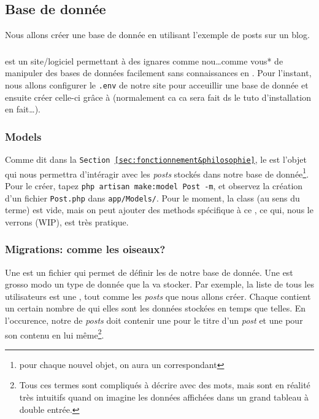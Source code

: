 \subsection{Base de donnée}
Nous allons créer une base de donnée en utilisant l'exemple de posts sur un blog.


\subsubsection[PHPMyAdmin][]{\phpmyadmin{}}
\phpmyadmin{} est un site/logiciel permettant à des ignares comme nou\ldots comme vous* de manipuler des bases de données facilement sans connaissances en \mysql. Pour l'instant, nous allons configurer le \verb|.env| de notre site pour acceuillir une base de donnée et ensuite créer celle-ci grâce à \phpmyadmin{} (normalement ca ca sera fait ds le tuto d'installation en fait\ldots).

\subsubsection[Models][laravel.com/docs/10.x/eloquent\#generating-model-classes]{Models}
Comme dit dans la \texttt{Section~\ref{sec:fonctionnement&philosophie}}, le \model{} est l'objet qui nous permettra d'intéragir avec les \textit{posts} stockés dans notre base de donnée\footnote{pour chaque nouvel objet, on aura un \model{} correspondant}. Pour le créer, tapez \verb|php artisan make:model Post -m|, et observez la création d'un fichier \verb|Post.php| dans \verb|app/Models/|. Pour le moment, la class (au sens \php{} du terme) est vide, mais on peut ajouter des methods spécifique à ce \model{}, ce qui, nous le verrons (WIP), est très pratique.

\subsubsection[Migrations: théorie][laravel.com/docs/10.x/migrations\#introduction]{Migrations: comme les oiseaux?}

Une \migration{} est un fichier qui permet de définir les \tables{} de notre base de donnée. Une \table{} est grosso modo un type de donnée que la \db{} va stocker. Par exemple, la liste de tous les utilisateurs est une \table{}, tout comme les \textit{posts} que nous allons créer. Chaque \table{} contient un certain nombre de \columns{} qui elles sont les données stockées en temps que telles. En l'occurence, notre \table{} de \textit{posts} doit contenir une \column{} pour le titre d'un \textit{post} et une pour son contenu en lui même\footnote{Tous ces termes sont compliqués à décrire avec des mots, mais sont en réalité très intuitifs quand on imagine les données affichées dans un grand tableau à double entrée.}.

